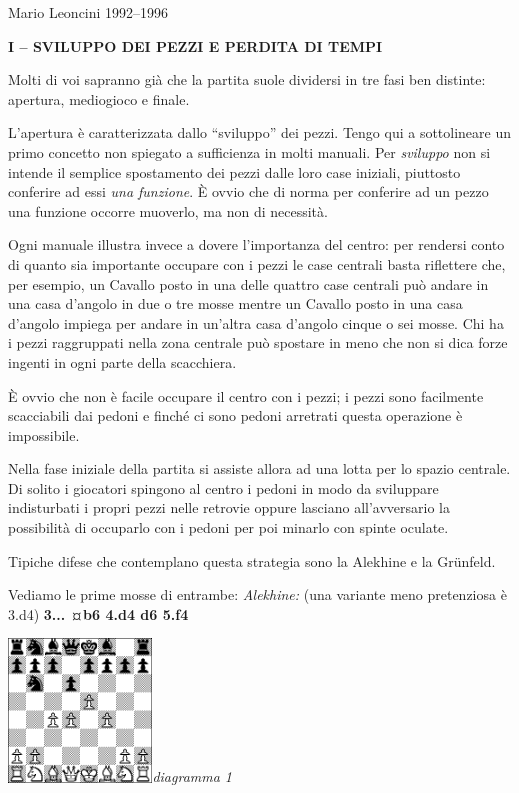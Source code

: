 \documentclass[
]{article}
\begin{document}
Mario Leoncini 1992--1996

\textbf{I -- SVILUPPO DEI PEZZI E PERDITA DI TEMPI}

Molti di voi sapranno già che la partita suole dividersi in tre fasi ben
distinte: apertura, mediogioco e finale.

L'apertura è caratterizzata dallo ``sviluppo'' dei pezzi. Tengo qui a
sottolineare un primo concetto non spiegato a sufficienza in molti
manuali. Per \emph{sviluppo} non si intende il semplice spostamento dei
pezzi dalle loro case iniziali, piuttosto conferire ad essi \emph{una
funzione}. È ovvio che di norma per conferire ad un pezzo una funzione
occorre muoverlo, ma non di necessità.

Ogni manuale illustra invece a dovere l'importanza del centro: per
rendersi conto di quanto sia importante occupare con i pezzi le case
centrali basta riflettere che, per esempio, un Cavallo posto in una
delle quattro case centrali può andare in una casa d'angolo in due o tre
mosse mentre un Cavallo posto in una casa d'angolo impiega per andare in
un'altra casa d'angolo cinque o sei mosse. Chi ha i pezzi raggruppati
nella zona centrale può spostare in meno che non si dica forze ingenti
in ogni parte della scacchiera.

È ovvio che non è facile occupare il centro con i pezzi; i pezzi sono
facilmente scacciabili dai pedoni e finché ci sono pedoni arretrati
questa operazione è impossibile.

Nella fase iniziale della partita si assiste allora ad una lotta per lo
spazio centrale. Di solito i giocatori spingono al centro i pedoni in
modo da sviluppare indisturbati i propri pezzi nelle retrovie oppure
lasciano all'avversario la possibilità di occuparlo con i pedoni per poi
minarlo con spinte oculate.

Tipiche difese che contemplano questa strategia sono la Alekhine e la
Grünfeld.

Vediamo le prime mosse di entrambe:
\newgame
\emph{Alekhine:}  (una variante meno
pretenziosa è 3.d4) \textbf{3... ¤b6 4.d4 d6 5.f4}

\includegraphics[width=1.50417in,height=1.50417in]{vertopal_109f12be458a423d8f3cc838880eaea2/media/image1.png}\emph{diagramma
1}
\end{document}
